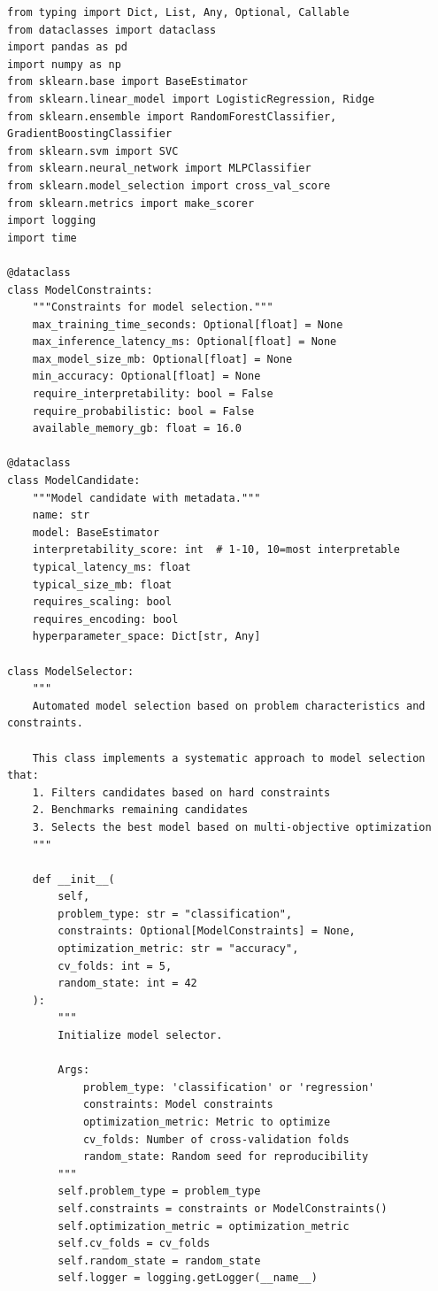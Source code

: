 \begin{lstlisting}[style=python, caption={Automated Model Selection Framework}]
from typing import Dict, List, Any, Optional, Callable
from dataclasses import dataclass
import pandas as pd
import numpy as np
from sklearn.base import BaseEstimator
from sklearn.linear_model import LogisticRegression, Ridge
from sklearn.ensemble import RandomForestClassifier, GradientBoostingClassifier
from sklearn.svm import SVC
from sklearn.neural_network import MLPClassifier
from sklearn.model_selection import cross_val_score
from sklearn.metrics import make_scorer
import logging
import time

@dataclass
class ModelConstraints:
    """Constraints for model selection."""
    max_training_time_seconds: Optional[float] = None
    max_inference_latency_ms: Optional[float] = None
    max_model_size_mb: Optional[float] = None
    min_accuracy: Optional[float] = None
    require_interpretability: bool = False
    require_probabilistic: bool = False
    available_memory_gb: float = 16.0

@dataclass
class ModelCandidate:
    """Model candidate with metadata."""
    name: str
    model: BaseEstimator
    interpretability_score: int  # 1-10, 10=most interpretable
    typical_latency_ms: float
    typical_size_mb: float
    requires_scaling: bool
    requires_encoding: bool
    hyperparameter_space: Dict[str, Any]

class ModelSelector:
    """
    Automated model selection based on problem characteristics and constraints.

    This class implements a systematic approach to model selection that:
    1. Filters candidates based on hard constraints
    2. Benchmarks remaining candidates
    3. Selects the best model based on multi-objective optimization
    """

    def __init__(
        self,
        problem_type: str = "classification",
        constraints: Optional[ModelConstraints] = None,
        optimization_metric: str = "accuracy",
        cv_folds: int = 5,
        random_state: int = 42
    ):
        """
        Initialize model selector.

        Args:
            problem_type: 'classification' or 'regression'
            constraints: Model constraints
            optimization_metric: Metric to optimize
            cv_folds: Number of cross-validation folds
            random_state: Random seed for reproducibility
        """
        self.problem_type = problem_type
        self.constraints = constraints or ModelConstraints()
        self.optimization_metric = optimization_metric
        self.cv_folds = cv_folds
        self.random_state = random_state
        self.logger = logging.getLogger(__name__)


\end{lstlisting}
